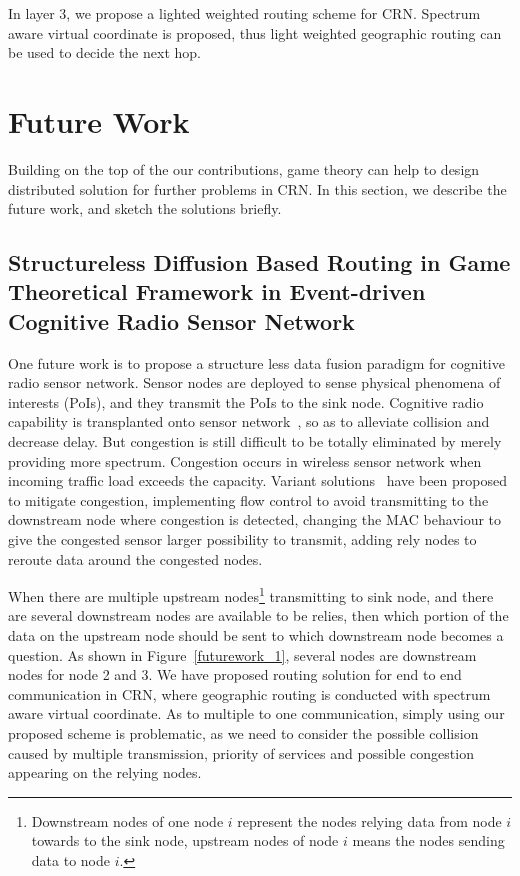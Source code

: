 In layer 3, we propose a lighted weighted routing scheme for CRN. 
Spectrum aware virtual coordinate is proposed, thus light weighted geographic routing can be used to decide the next hop.

\section{Future Work}
Building on the top of the our contributions, game theory can help to design distributed solution for further problems in CRN.
In this section, we describe the future work, and sketch the solutions briefly.

\subsection*{Structureless Diffusion Based Routing in Game Theoretical Framework in Event-driven Cognitive Radio Sensor Network}
One future work is to propose a structure less data fusion paradigm for cognitive radio sensor network.
Sensor nodes are deployed to sense physical phenomena of interests (PoIs), and they transmit the PoIs to the sink node.
Cognitive radio capability is transplanted onto sensor network~\cite{cr_sensor_2009}, so as to alleviate collision and decrease delay.
But congestion is still difficult to be totally eliminated by merely providing more spectrum.
%
Congestion occurs in wireless sensor network when incoming traffic load exceeds the capacity.
Variant solutions~\cite{congestion_control_wsn_2014} have been proposed to mitigate congestion, \eg implementing flow control to avoid transmitting to the downstream node where congestion is detected, changing the MAC behaviour to give the congested sensor larger possibility to transmit, adding rely nodes to reroute data around the congested nodes.


When there are multiple upstream nodes\footnote{Downstream nodes of one node $i$ represent the nodes relying data from node $i$ towards to the sink node, upstream nodes of node $i$ means the nodes sending data to node $i$.} transmitting to sink node, and there are several downstream nodes are available to be relies, then which portion of the data on the upstream node should be sent to which downstream node becomes a question.
As shown in Figure~\ref{futurework_1}, several nodes are downstream nodes for node 2 and 3.
We have proposed routing solution for end to end communication in CRN, where geographic routing is conducted with spectrum aware virtual coordinate.
As to multiple to one communication, simply using our proposed scheme is problematic, as we need to consider the possible collision caused by multiple transmission, priority of services and possible congestion appearing on the relying nodes.

